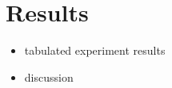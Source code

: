 \chapter{Results}\label{chapter:results}

\begin{itemize}
    \item tabulated experiment results
    \item discussion
\end{itemize}
